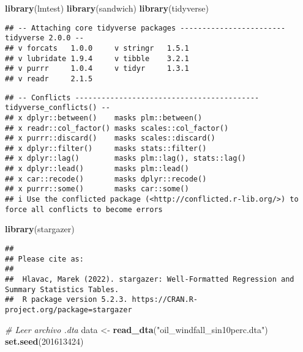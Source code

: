 \documentclass[
]{article}
\newenvironment{Shaded}{\begin{snugshade}}{\end{snugshade}}
\newcommand{\CommentTok}[1]{\textcolor[rgb]{0.56,0.35,0.01}{\textit{#1}}}
\newcommand{\DecValTok}[1]{\textcolor[rgb]{0.00,0.00,0.81}{#1}}
\newcommand{\FunctionTok}[1]{\textcolor[rgb]{0.13,0.29,0.53}{\textbf{#1}}}
\newcommand{\NormalTok}[1]{#1}
\newcommand{\OtherTok}[1]{\textcolor[rgb]{0.56,0.35,0.01}{#1}}
\newcommand{\StringTok}[1]{\textcolor[rgb]{0.31,0.60,0.02}{#1}}
\begin{document}
\begin{Shaded}
\begin{Highlighting}[]
\FunctionTok{library}\NormalTok{(lmtest)}
\FunctionTok{library}\NormalTok{(sandwich)}
\FunctionTok{library}\NormalTok{(tidyverse)}
\end{Highlighting}
\end{Shaded}

\begin{verbatim}
## -- Attaching core tidyverse packages ------------------------ tidyverse 2.0.0 --
## v forcats   1.0.0     v stringr   1.5.1
## v lubridate 1.9.4     v tibble    3.2.1
## v purrr     1.0.4     v tidyr     1.3.1
## v readr     2.1.5
\end{verbatim}

\begin{verbatim}
## -- Conflicts ------------------------------------------ tidyverse_conflicts() --
## x dplyr::between()    masks plm::between()
## x readr::col_factor() masks scales::col_factor()
## x purrr::discard()    masks scales::discard()
## x dplyr::filter()     masks stats::filter()
## x dplyr::lag()        masks plm::lag(), stats::lag()
## x dplyr::lead()       masks plm::lead()
## x car::recode()       masks dplyr::recode()
## x purrr::some()       masks car::some()
## i Use the conflicted package (<http://conflicted.r-lib.org/>) to force all conflicts to become errors
\end{verbatim}

\begin{Shaded}
\begin{Highlighting}[]
\FunctionTok{library}\NormalTok{(stargazer)}
\end{Highlighting}
\end{Shaded}

\begin{verbatim}
## 
## Please cite as: 
## 
##  Hlavac, Marek (2022). stargazer: Well-Formatted Regression and Summary Statistics Tables.
##  R package version 5.2.3. https://CRAN.R-project.org/package=stargazer
\end{verbatim}

\begin{Shaded}
\begin{Highlighting}[]
\CommentTok{\# Leer archivo .dta}
\NormalTok{data }\OtherTok{\textless{}{-}} \FunctionTok{read\_dta}\NormalTok{(}\StringTok{"oil\_windfall\_sin10perc.dta"}\NormalTok{)}
\FunctionTok{set.seed}\NormalTok{(}\DecValTok{201613424}\NormalTok{)}
\end{Highlighting}
\end{Shaded}
\end{document}
